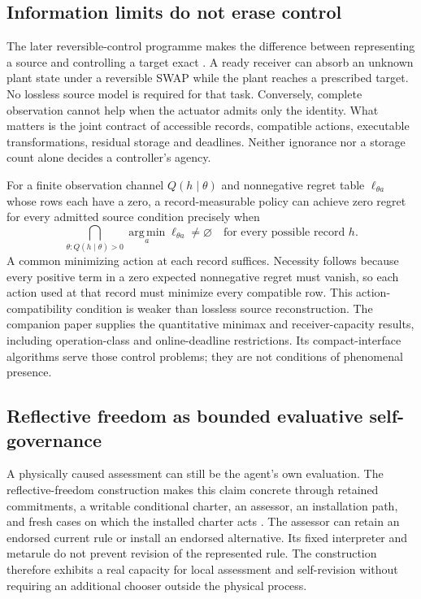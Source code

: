\subsection{Information limits do not erase control}
The later reversible-control programme makes the difference between representing a source and controlling a target exact \cite[Sections~2--5]{RodgersReversibleControl}. A ready receiver can absorb an unknown plant state under a reversible SWAP while the plant reaches a prescribed target. No lossless source model is required for that task. Conversely, complete observation cannot help when the actuator admits only the identity. What matters is the joint contract of accessible records, compatible actions, executable transformations, residual storage and deadlines. Neither ignorance nor a storage count alone decides a controller's agency.

For a finite observation channel $Q(h\mid\theta)$ and nonnegative regret table $\ell_{\theta a}$ whose rows each have a zero, a record-measurable policy can achieve zero regret for every admitted source condition precisely when
\[
 \bigcap_{\theta:Q(h\mid\theta)>0}
       \operatorname*{arg\,min}_{a}\ell_{\theta a}\ne\varnothing
 \quad\text{for every possible record }h.
\]
A common minimizing action at each record suffices. Necessity follows because every positive term in a zero expected nonnegative regret must vanish, so each action used at that record must minimize every compatible row. This action-compatibility condition is weaker than lossless source reconstruction. The companion paper supplies the quantitative minimax and receiver-capacity results, including operation-class and online-deadline restrictions. Its compact-interface algorithms serve those control problems; they are not conditions of phenomenal presence.

\subsection{Reflective freedom as bounded evaluative self-governance}
A physically caused assessment can still be the agent's own evaluation. The reflective-freedom construction makes this claim concrete through retained commitments, a writable conditional charter, an assessor, an installation path, and fresh cases on which the installed charter acts \cite[Sections~2--4]{RodgersReflectiveFreedom}. The assessor can retain an endorsed current rule or install an endorsed alternative. Its fixed interpreter and metarule do not prevent revision of the represented rule. The construction therefore exhibits a real capacity for local assessment and self-revision without requiring an additional chooser outside the physical process.

